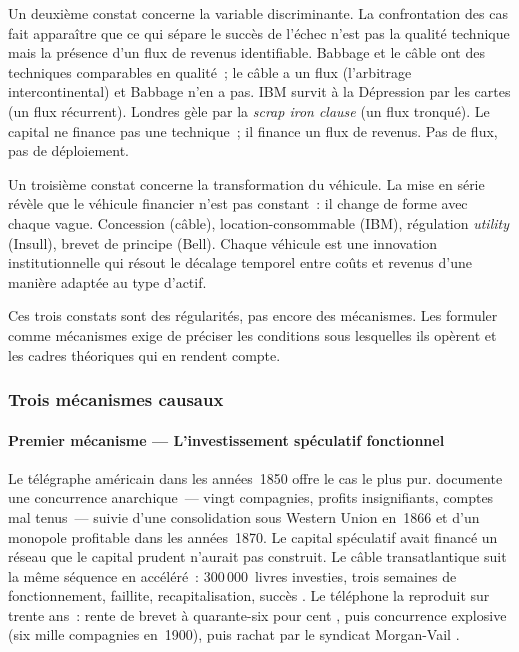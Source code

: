 Un deuxième constat concerne la variable discriminante. La confrontation des cas fait apparaître que ce qui sépare le succès de l'échec n'est pas la qualité technique mais la présence d'un flux de revenus identifiable. Babbage et le câble ont des techniques comparables en qualité~; le câble a un flux (l'arbitrage intercontinental) et Babbage n'en a pas. IBM survit à la Dépression par les cartes (un flux récurrent). Londres gèle par la \emph{scrap iron clause} (un flux tronqué). Le capital ne finance pas une technique~; il finance un flux de revenus. Pas de flux, pas de déploiement.

Un troisième constat concerne la transformation du véhicule. La mise en série révèle que le véhicule financier n'est pas constant~: il change de forme avec chaque vague. Concession (câble), location-consommable (IBM), régulation \emph{utility} (Insull), brevet de principe (Bell). Chaque véhicule est une innovation institutionnelle qui résout le décalage temporel entre coûts et revenus d'une manière adaptée au type d'actif.

Ces trois constats sont des régularités, pas encore des mécanismes. Les formuler comme mécanismes exige de préciser les conditions sous lesquelles ils opèrent et les cadres théoriques qui en rendent compte.


\subsubsection{Trois mécanismes causaux}

\paragraph{Premier mécanisme --- L'investissement spéculatif fonctionnel}

Le télégraphe américain dans les années~1850 offre le cas le plus pur. \textcite{nonnenmacher_telegraph_2001} documente une concurrence anarchique~--- vingt compagnies, profits insignifiants, comptes mal tenus~--- suivie d'une consolidation sous Western Union en~1866 et d'un monopole profitable dans les années~1870. Le capital spéculatif avait financé un réseau que le capital prudent n'aurait pas construit. Le câble transatlantique suit la même séquence en accéléré~: 300\,000~livres investies, trois semaines de fonctionnement, faillite, recapitalisation, succès \parencite{gordon_thread_2002}. Le téléphone la reproduit sur trente ans~: rente de brevet à quarante-six pour cent \parencite{gabel_early_1969}, puis concurrence explosive (six mille compagnies en~1900), puis rachat par le syndicat Morgan-Vail \parencite{mueller_universal_1993}.

